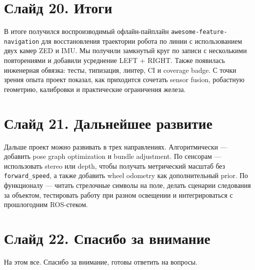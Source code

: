 \documentclass[12pt,a4paper]{article}
\newcommand{\project}{\texttt{awesome-feature-navigation}}
\newcommand{\code}[1]{\texttt{#1}}
\begin{document}
\section*{Слайд 20. Итоги}

В итоге получился воспроизводимый офлайн-пайплайн \project{} для восстановления траектории робота по линии с использованием двух камер ZED и IMU. Мы получили замкнутый круг по записи с несколькими повторениями и добавили усреднение LEFT + RIGHT. Также появилась инженерная обвязка: тесты, типизация, линтер, CI и coverage badge. С точки зрения опыта проект показал, как приходится сочетать sensor fusion, робастную геометрию, калибровки и практические ограничения железа.

\section*{Слайд 21. Дальнейшее развитие}

Дальше проект можно развивать в трех направлениях. Алгоритмически --- добавить pose graph optimization и bundle adjustment. По сенсорам --- использовать stereo или depth, чтобы получать метрический масштаб без \code{forward\_speed}, а также добавить wheel odometry как дополнительный prior. По функционалу --- читать стрелочные символы на поле, делать сценарии следования за объектом, тестировать работу при разном освещении и интегрироваться с прошлогодним ROS-стеком.

\section*{Слайд 22. Спасибо за внимание}

На этом все. Спасибо за внимание, готовы ответить на вопросы.
\end{document}
